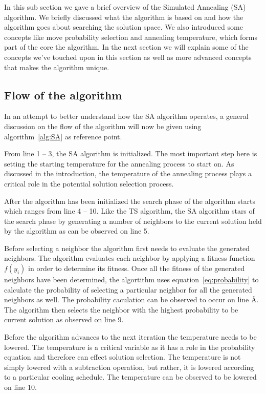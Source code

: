 In this sub section we gave a brief overview of the Simulated Annealing (SA) algorithm. We briefly discussed what the algorithm is based on and how the algorithm goes about searching the solution space. We also introduced some concepts like move probability selection and annealing temperature, which forms part of the core the algorithm. In the next section we will explain some of the concepts we've touched upon in this section as well as more advanced concepts that makes the algorithm unique.

\subsection{Flow of the algorithm}
In an attempt to better understand how the SA algorithm operates, a general discussion on the flow of the algorithm will now be given using algorithm~\ref{alg:SA} as reference point.

From line 1 -- 3, the SA algorithm is initialized. The most important step here is setting the starting temperature for the annealing process to start on. As discussed in the introduction, the temperature of the annealing process plays a critical role in the potential solution selection process.

After the algorithm has been initialized the search phase of the algorithm starts which ranges from line 4 -- 10. Like the TS algorithm, the SA algorithm stars of the search phase by generating a number of neighbors to the current solution held by the algorithm as can be observed on line 5.

Before selecting a neighbor the algorithm first needs to evaluate the generated neighbors. The algorithm evaluates each neighbor by applying a fitness function $f(y_i)$ in order to determine its fitness.
Once all the fitness of the generated neighbors have been determined, the algortithm uses equation~\ref{eq:probability} to calculate the probability of selecting a particular neighbor for all the generated neighbors as well. The probability caculation can be observed to occur on line Â. The algorithm then selects the neighbor with the highest probability to be current solution as observed on line 9. 

Before the algorithm advances to the next iteration the temperature needs to be lowered. The temperature is a critical variable as it has a role in the probability equation and therefore can effect solution selection. The temperature is not simply lowered with a subtraction operation, but rather, it is lowered according to a particular cooling schedule. The temperature can be observed to be lowered on line 10.

